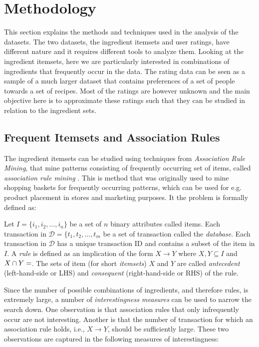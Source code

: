 \section{Methodology}
\label{sec:methodology}

This section explains the methods and techniques used in the analysis of the datasets.
The two datasets, the ingredient itemsets and user ratings, have different nature and it requires different tools to analyze them.
Looking at the ingredient itemsets, here we are particularly interested in combinations of ingredients that frequently occur in the data.
The rating data can be seen as a sample of a much larger dataset that contains preferences of a set of people towards a set of recipes.
Most of the ratings are however unknown and the main objective here is to approximate these ratings such that they can be studied in relation to the ingredient sets.




\subsection{Frequent Itemsets and Association Rules}
\label{subsec:frequent_itemsets}

The ingredient itemsets can be studied using techniques from \emph{Association Rule Mining}, that mine patterns consisting of frequently occurring set of items, called \emph{association rule mining} \citep{Agrawal1993}.
This is method that was originally used to mine shopping baskets for frequently occurring patterns, which can be used for e.g. product placement in stores and marketing purposes.
It the problem is formally defined as:

\begin{definition}
	Let $I = \{i_1, i_2, \dots, i_n\}$ be a set of $n$ binary attributes called items. Each transaction in $\mathcal{D}=\{t_1, t_2, \dots, t_m$ be a set of transaction called the \emph{database}. Each transaction in $\mathcal{D}$ has a unique transaction ID and contains a subset of the item in $I$. A \emph{rule} is defined as an implication of the form $X \rightarrow Y$ where $X,Y \subseteq I$ and $X \cap Y=\empty$. The sets of item (for short \emph{itemsets}) $X$ and $Y$ are called \emph{antecedent} (left-hand-side or LHS) and \emph{consequent} (right-hand-side or RHS) of the rule.
\end{definition}

Since the number of possible combinations of ingredients, and therefore rules, is extremely large, a number of \emph{interestingness measures} can be used to narrow the search down.
One observation is that association rules that only infrequently occur are not interesting.
Another is that the number of transaction for which an association rule holds, i.e., $X \rightarrow Y$, should be sufficiently large.
These two observations are captured in the following measures of interestingness:

